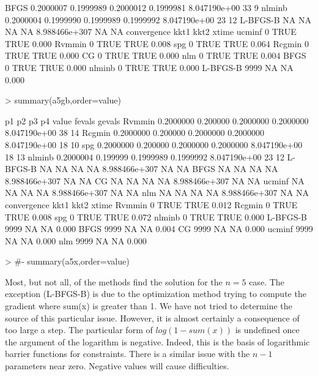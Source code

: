 \documentclass[11pt]{article}
\begin{document}
\begin{Schunk}
\begin{Soutput}
BFGS     0.2000007 0.1999989 0.2000012 0.1999981  8.047190e+00     33      9
nlminb   0.2000004 0.1999990 0.1999989 0.1999992  8.047190e+00     23     12
L-BFGS-B        NA        NA        NA        NA 8.988466e+307     NA     NA
         convergence kkt1 kkt2 xtime
ucminf             0 TRUE TRUE 0.000
Rvmmin             0 TRUE TRUE 0.008
spg                0 TRUE TRUE 0.064
Rcgmin             0 TRUE TRUE 0.000
CG                 0 TRUE TRUE 0.000
nlm                0 TRUE TRUE 0.004
BFGS               0 TRUE TRUE 0.000
nlminb             0 TRUE TRUE 0.000
L-BFGS-B        9999   NA   NA 0.000
\end{Soutput}
\begin{Sinput}
> summary(a5gb,order=value)
\end{Sinput}
\begin{Soutput}
                p1       p2        p3        p4         value fevals gevals
Rvmmin   0.2000000 0.200000 0.2000000 0.2000000  8.047190e+00     38     14
Rcgmin   0.2000000 0.200000 0.2000000 0.2000000  8.047190e+00     18     10
spg      0.2000000 0.200000 0.2000000 0.2000000  8.047190e+00     18     13
nlminb   0.2000004 0.199999 0.1999989 0.1999992  8.047190e+00     23     12
L-BFGS-B        NA       NA        NA        NA 8.988466e+307     NA     NA
BFGS            NA       NA        NA        NA 8.988466e+307     NA     NA
CG              NA       NA        NA        NA 8.988466e+307     NA     NA
ucminf          NA       NA        NA        NA 8.988466e+307     NA     NA
nlm             NA       NA        NA        NA 8.988466e+307     NA     NA
         convergence kkt1 kkt2 xtime
Rvmmin             0 TRUE TRUE 0.012
Rcgmin             0 TRUE TRUE 0.008
spg                0 TRUE TRUE 0.072
nlminb             0 TRUE TRUE 0.000
L-BFGS-B        9999   NA   NA 0.000
BFGS            9999   NA   NA 0.004
CG              9999   NA   NA 0.000
ucminf          9999   NA   NA 0.000
nlm             9999   NA   NA 0.000
\end{Soutput}
\begin{Sinput}
> #- summary(a5x,order=value)
\end{Sinput}
\end{Schunk}

Most, but not all, of the methods find the solution for the $n=5$ case. The exception (L-BFGS-B) is 
due to the optimization method trying to compute the gradient where sum(x) is greater than 1. We 
have not tried to determine the source of this particular issue. However, it is almost certainly 
a consequence of too large a step. The particular form of $log(1-sum(x))$ 
is undefined once the argument of
the logarithm is negative. Indeed, this is the basis of 
logarithmic barrier functions for constraints. There
is a similar issue with the $n-1$ parameters near zero. Negative values will cause difficulties. 
\end{document}
